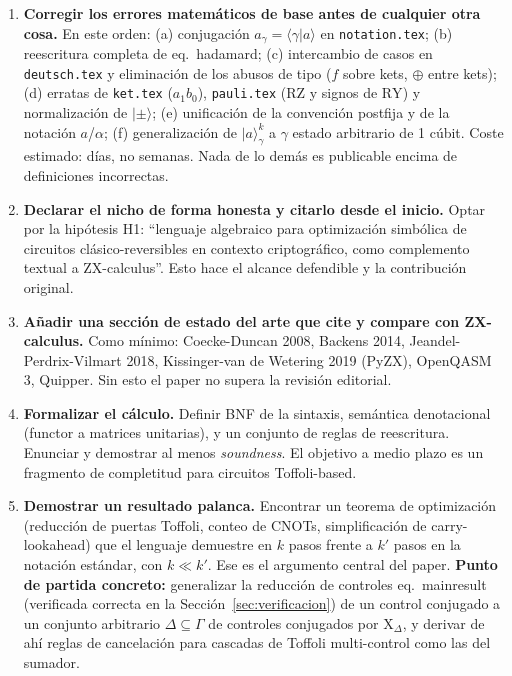 \documentclass[12pt, a4paper]{article}
\newcommand{\gate}[1]{\text{#1}}
\newcommand{\stateket}[3]{\ket{#1}^{#2}_{#3}}
\newcommand{\ket}[1]{|#1\rangle}
\newcommand{\braket}[2]{\langle #1|#2\rangle}
\begin{document}
\begin{enumerate}[label=\textbf{R\arabic*.}, start=0]

  \item \textbf{Corregir los errores matemáticos de base antes de
          cualquier otra cosa.}
        En este orden: (a) conjugación $a_\gamma=\braket{\gamma}{a}$ en
        \texttt{notation.tex}; (b) reescritura completa de eq.~hadamard;
        (c) intercambio de casos en \texttt{deutsch.tex} y eliminación de los
        abusos de tipo ($f$ sobre kets, $\oplus$ entre kets); (d) erratas de
        \texttt{ket.tex} ($a_1b_0$), \texttt{pauli.tex} ($\gate{RZ}$ y signos
        de $\gate{RY}$) y normalización de $\ket{\pm}$; (e) unificación de la convención
        postfija y de la notación $a$/$\alpha$; (f) generalización de
        $\stateket{a}{k}{\gamma}$ a $\gamma$ estado arbitrario de 1 cúbit.
        Coste estimado: días, no semanas. Nada de lo demás es publicable
        encima de definiciones incorrectas.

  \item \textbf{Declarar el nicho de forma honesta y citarlo desde el
          inicio.}
        Optar por la hipótesis H1: ``lenguaje algebraico para optimización
        simbólica de circuitos clásico-reversibles en contexto criptográfico,
        como complemento textual a ZX-calculus''. Esto hace el alcance
        defendible y la contribución original.

  \item \textbf{Añadir una sección de estado del arte que cite y compare
          con ZX-calculus.}
        Como mínimo: Coecke-Duncan 2008, Backens 2014,
        Jeandel-Perdrix-Vilmart 2018, Kissinger-van de Wetering 2019 (PyZX),
        OpenQASM 3, Quipper.
        Sin esto el paper no supera la revisión editorial.

  \item \textbf{Formalizar el cálculo.}
        Definir BNF de la sintaxis, semántica denotacional (functor a
        matrices unitarias), y un conjunto de reglas de reescritura. Enunciar
        y demostrar al menos \emph{soundness}. El objetivo a medio plazo es
        un fragmento de completitud para circuitos Toffoli-based.

  \item \textbf{Demostrar un resultado palanca.}
        Encontrar un teorema de optimización (reducción de puertas Toffoli,
        conteo de CNOTs, simplificación de carry-lookahead) que el lenguaje
        demuestre en $k$ pasos frente a $k'$ pasos en la notación estándar,
        con $k \ll k'$. Ese es el argumento central del paper.
        \textbf{Punto de partida concreto:} generalizar la reducción de
        controles eq.~mainresult (verificada correcta en la
        Sección~\ref{sec:verificacion}) de un control conjugado a un conjunto
        arbitrario $\Delta \subseteq \Gamma$ de controles conjugados por
        $\gate{X}_\Delta$, y derivar de ahí reglas de cancelación para
        cascadas de Toffoli multi-control como las del sumador.


\end{enumerate}
\end{document}
